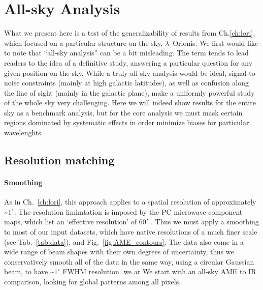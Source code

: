 \chapter{All-sky Analysis}
  \label{ch:allsky}
    What we present here is a test of the generalizability of results from Ch.\ref{ch:lori}, which focused on a particular structure on the sky, $\lambda$~Orionis.
    We first would like to note that ``all-sky analysis'' can be a bit misleading. The term tends to lead readers to the idea of a definitive study, answering a particular question for any given position on the sky.  While a truly all-sky analysis would be ideal, signal-to-noise constraints (mainly at high galactic latitudes), as well as confusion along the line of sight (mainly in the galactic plane), make a uniformly powerful study of the whole sky very challenging. Here we will indeed show results for the entire sky as a benchmark analysis, but for the core analysis we must mask certain regions dominated by systematic effects in order minimize biases for particular wavelenghts.

\section{Resolution matching}
    \subsubsection{Smoothing}
        As in Ch.~\ref{ch:lori}, this approach applies to a spatial resolution of approximately \textasciitilde{}$1^{\circ}$. The resolution limimtation is imposed by the PC microwave component maps, which list an `effective resolution' of 60$'$ \citep{planck15X}. Thus we must apply a smoothing to most of our input datasets, which have native resolutions of a much finer scale (see Tab.~\ref{tab:data}), and Fig.~\ref{fig:AME_contours}. The data also come in a wide range of beam shapes with their own degrees of uncertainty, thus we conservatively smooth all of the data in the same way, using a circular Gaussian beam, to have \textasciitilde{}$1^{\circ}$ FWHM resolution. we ar We start with an all-sky AME to IR comparison, looking for global patterns among all pixels.

